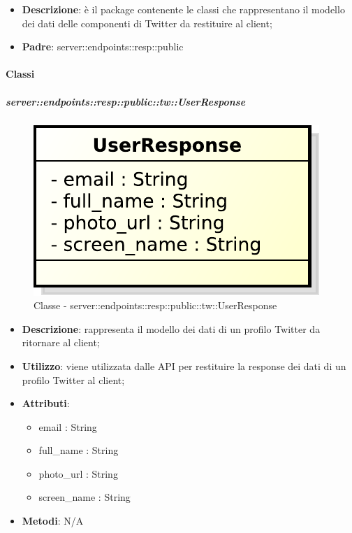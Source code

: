 \begin{itemize}
  \item \textbf{Descrizione}: è il package contenente le classi che rappresentano il modello dei dati delle componenti di Twitter da restituire al client;
  \item \textbf{Padre}: server::endpoints::resp::public
\end{itemize}

	\paragraph{Classi} %

    \subparagraph{server::endpoints::resp::public::tw::UserResponse} %
    \label{subp:bdsm_app_server_endpoints_resp_public_tw_userresponse}
	\begin{figure}[!htbp]
		\centering
		\centerline{\includegraphics[scale=0.6]{./images/server/classes/endpoints/tw/user_response.pdf}}
		\caption{Classe - server::endpoints::resp::public::tw::UserResponse}
	\end{figure}
    \begin{itemize}
      \item \textbf{Descrizione}: rappresenta il modello dei dati di un profilo Twitter da ritornare al client;
      \item \textbf{Utilizzo}: viene utilizzata dalle API per restituire la response dei dati di un profilo Twitter al client;

	  \item \textbf{Attributi}:
	  	\begin{itemize}
	  		\item email : String
	  		\item full\_name : String
	  		\item photo\_url : String
	  		\item screen\_name : String
	  	\end{itemize}
	  \item \textbf{Metodi}: N/A
      \end{itemize}

